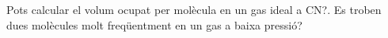 \begin{exr}
Pots calcular el volum ocupat per molècula en un gas ideal a CN?. Es troben dues molècules molt freqüentment en un gas a baixa pressió?
\end{exr}